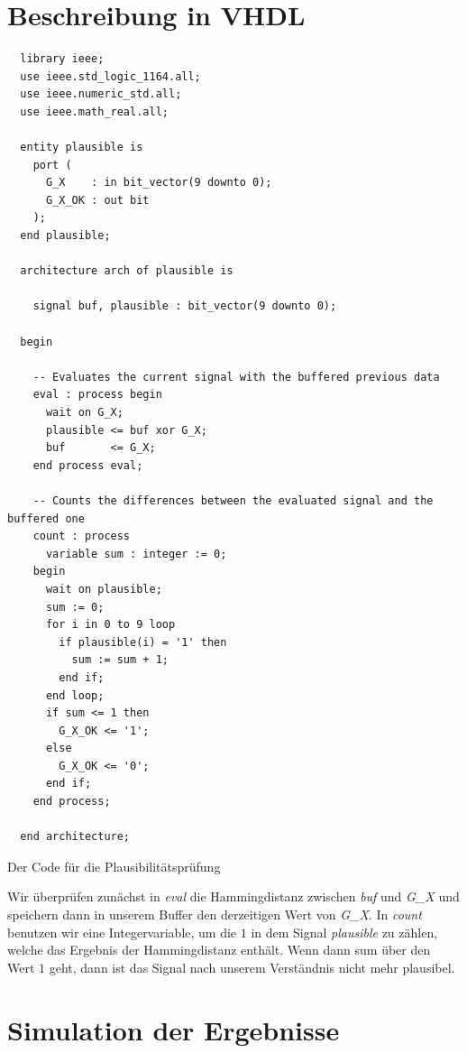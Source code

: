 \documentclass{report}
\newenvironment{longlisting}{\captionsetup{type=listing}}{}
\begin{document}
\section{Beschreibung in VHDL}
\label{sec:beschreibung-vhdl}
\begin{longlisting}
  \centering
  
  \begin{verbatim}
  library ieee;
  use ieee.std_logic_1164.all;
  use ieee.numeric_std.all;
  use ieee.math_real.all;

  entity plausible is
    port (
      G_X    : in bit_vector(9 downto 0);
      G_X_OK : out bit
    );
  end plausible;

  architecture arch of plausible is

    signal buf, plausible : bit_vector(9 downto 0);

  begin

    -- Evaluates the current signal with the buffered previous data
    eval : process begin
      wait on G_X;
      plausible <= buf xor G_X;
      buf       <= G_X;
    end process eval;

    -- Counts the differences between the evaluated signal and the buffered one
    count : process
      variable sum : integer := 0;
    begin
      wait on plausible;
      sum := 0;
      for i in 0 to 9 loop
        if plausible(i) = '1' then
          sum := sum + 1;
        end if;
      end loop;
      if sum <= 1 then
        G_X_OK <= '1';
      else
        G_X_OK <= '0';
      end if;
    end process;

  end architecture;
  \end{verbatim}
  \caption{Der Code für die Plausibilitätsprüfung}
  \label{fig:codeA}
\end{longlisting}

Wir überprüfen zunächst in \textit{eval} die Hammingdistanz zwischen \textit{buf} und \textit{G\_X} und speichern dann in unserem Buffer den derzeitigen Wert von \textit{G\_X}. In \textit{count} benutzen wir eine Integervariable, um die $1$ in dem Signal \textit{plausible} zu zählen, welche das Ergebnis der Hammingdistanz enthält. Wenn dann sum über den Wert $1$ geht, dann ist das Signal nach unserem Verständnis nicht mehr plausibel. 

\newpage

\section{Simulation der Ergebnisse}
\label{sec:simul-der-ergebn}
\end{document}
